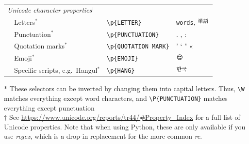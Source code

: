 \begin{table}
{\begin{tabularx}{\textwidth}{lllll}
\multicolumn{4}{l}{\textit{Unicode character properties$^\dagger$}} \\
& Letters$^*$ & \multicolumn{2}{l}{\texttt{\small{\textbackslash{}}p\{LETTER\}}} & \texttt{\small{words}}, \includegraphics[height=1em]{chapter09/tango.pdf}\\
& Punctuation$^*$ &\multicolumn{2}{l}{ \texttt{\small{\textbackslash{}}p\{PUNCTUATION\}}} & . , : \\
& Quotation marks$^*$ & \multicolumn{2}{l}{\texttt{\small{\textbackslash{}}p\{QUOTATION MARK\}}} & ' ` " «  \\
& Emoji$^*$ & \multicolumn{2}{l}{\texttt{\small{\textbackslash{}}p\{EMOJI\}}} & \includegraphics[height=1em]{chapter09/emoji.pdf}  \\
& Specific scripts, e.g.\ Hangul$^*$& \multicolumn{2}{l}{\texttt{\small{\textbackslash{}}p\{HANG\}}} & \includegraphics[height=1em]{chapter09/hangul.pdf}\\

    \bottomrule
  \end{tabularx}}{\small
    $*$ These selectors can be inverted by changing them into  capital letters.   Thus, \texttt{\small{\textbackslash W}} matches everything except word characters, and \texttt{\small{\textbackslash{}}P\{PUNCTUATION\}} matches everything except punctuation\\
    $\dagger$ See \url{https://www.unicode.org/reports/tr44/\#Property\_Index} for a full list of Unicode properties. Note that when using Python, these are only available if you use \emph{regex}, which is a drop-in replacement for the more common \emph{re}.}
\end{table}


